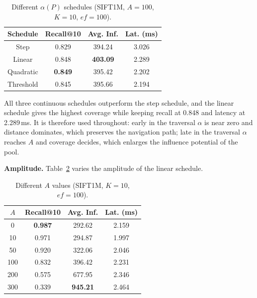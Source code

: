 \documentclass[conference]{IEEEtran}
\begin{document}
\begin{table}[h]
\caption{Different $\alpha(P)$ schedules (SIFT1M, $A{=}100$, $K{=}10$,
$\mathit{ef}{=}100$).}
\label{tab:s3-alpha}
\begin{center}
\begin{tabular}{|c|c|c|c|}
\hline
\textbf{Schedule} & \textbf{Recall@10} & \textbf{Avg. Inf.} & \textbf{Lat. (ms)} \\
\hline
Step      & 0.829 & 394.24 & 3.026 \\
Linear    & 0.848 & \textbf{403.09} & 2.289 \\
Quadratic & \textbf{0.849} & 395.42 & 2.202 \\
Threshold & 0.845 & 395.66 & 2.194 \\
\hline
\end{tabular}
\end{center}
\end{table}

All three continuous schedules outperform the step schedule, and the linear
schedule gives the highest coverage while keeping recall at 0.848 and latency at
2.289\,ms. It is therefore used throughout: early in the traversal $\alpha$ is
near zero and distance dominates, which preserves the navigation path; late in
the traversal $\alpha$ reaches $A$ and coverage decides, which enlarges the
influence potential of the pool.

\textbf{Amplitude.} Table~\ref{tab:s3-A} varies the amplitude of the linear
schedule.

\begin{table}[h]
\caption{Different $A$ values (SIFT1M, $K{=}10$, $\mathit{ef}{=}100$).}
\label{tab:s3-A}
\begin{center}
\begin{tabular}{|c|c|c|c|}
\hline
\textbf{$A$} & \textbf{Recall@10} & \textbf{Avg. Inf.} & \textbf{Lat. (ms)} \\
\hline
0   & \textbf{0.987} & 292.62 & 2.159 \\
10  & 0.971 & 294.87 & 1.997 \\
50  & 0.920 & 322.06 & 2.046 \\
100 & 0.832 & 396.42 & 2.231 \\
200 & 0.575 & 677.95 & 2.346 \\
300 & 0.339 & \textbf{945.21} & 2.464 \\
\hline
\end{tabular}
\end{center}
\end{table}
\end{document}
